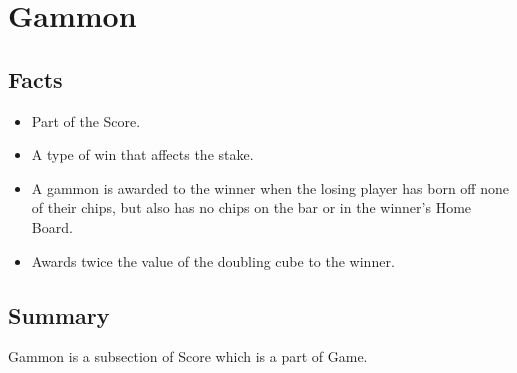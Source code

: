
\section{Gammon}

\subsection{Facts}
\begin{itemize} [itemsep=2pt,parsep=2pt]
    \item Part of the Score.
    \item A type of win that affects the stake.
    \item A gammon is awarded to the winner when the losing player has born off none of their chips, but also has no chips on the bar or in the winner's Home Board.
    \item Awards twice the value of the doubling cube to the winner.
\end{itemize}


\subsection{Summary}
Gammon is a subsection of Score which is a part of Game.
